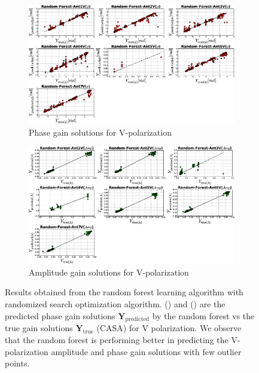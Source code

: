 \begin{figure}[H]
   \centering
    \begin{subfigure}[t]{0.52\textheight}
        
        \includegraphics[width=\textwidth]{images/Random-ForestVphase.eps} 
        \caption{Phase gain solutions for V-polarization} \label{A3}
    \end{subfigure}
    
      \begin{subfigure}[t]{0.52\textheight}
       
        \includegraphics[width=\textwidth]{images/Random-ForestVamp.eps} 
        \caption{Amplitude gain solutions for V-polarization} \label{B3}
    \end{subfigure}
    \caption{Results obtained from the random forest learning algorithm with randomized search optimization algorithm. () and () are the predicted phase gain solutions $\textbf{Y}_\mathrm{predicted}$ by the random forest vs the true gain solutions $\textbf{Y}_\mathrm{true}$ (CASA) for V polarization. We observe that the random forest is performing better in predicting the V-polarization amplitude and phase gain solutions with few outlier points. }
    \label{BBB2}
    \end{figure} 
   
